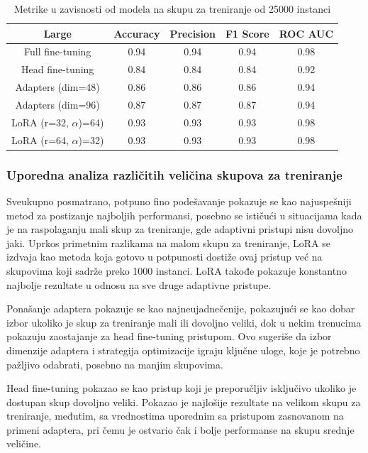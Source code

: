 \documentclass[12pt,oneside]{memoir}
\begin{document}
\begin{table}[h!]
	\centering
	\setlength{\tabcolsep}{12pt}
	\renewcommand{\arraystretch}{1.5}
	\begin{tabular}{|c|c|c|c|c|} 
		\hline
		\textbf{Large} & \textbf{Accuracy} & \textbf{Precision} & \textbf{F1 Score} & \textbf{ROC AUC}  \\
		\hline
		Full fine-tuning     & 0.94 & 0.94 & 0.94 & 0.98 \\ 
		Head fine-tuning     & 0.84 & 0.84 & 0.84 & 0.92 \\ 
		Adapters (dim=48)  & 0.86 & 0.86 & 0.86 & 0.94 \\ 
		Adapters (dim=96)  & 0.87 & 0.87 & 0.87 & 0.94 \\ 
		LoRA (r=32, \(\alpha\))=64)    & 0.93 & 0.93 & 0.93 & 0.98 \\ 
		LoRA (r=64, \(\alpha\))=32)    & 0.93 & 0.93 & 0.93 & 0.98 \\ 
		\hline
	\end{tabular}
	\caption{Metrike u zavisnosti od modela na skupu za treniranje od 25000 instanci}
	\label{tab:EvaluationFullDataset}
\end{table}

\subsubsection{Uporedna analiza različitih veličina skupova za treniranje}
Sveukupno posmatrano, potpuno fino podešavanje pokazuje se kao najuspešniji metod za postizanje najboljih performansi, posebno se ističući u situacijama kada je na raspolaganju mali skup za treniranje, gde adaptivni pristupi nisu dovoljno jaki. Uprkos primetnim razlikama na malom skupu za treniranje, LoRA se izdvaja kao metoda koja gotovo u potpunosti dostiže ovaj pristup već na skupovima koji sadrže preko 1000 instanci. LoRA takođe pokazuje konstantno najbolje rezultate u odnosu na sve druge adaptivne pristupe.

Ponašanje adaptera pokazuje se kao najneujadnečenije, pokazujući se kao dobar izbor ukoliko je skup za treniranje mali ili dovoljno veliki, dok u nekim trenucima pokazuju zaostajanje za head fine-tuning pristupom. Ovo sugeriše da izbor dimenzije adaptera i strategija optimizacije igraju ključne uloge, koje je potrebno pažljivo odabrati, posebno na manjim skupovima.

Head fine-tuning pokazao se kao pristup koji je preporučljiv isključivo ukoliko je dostupan skup dovoljno veliki. Pokazao je najlošije rezultate na velikom skupu za treniranje, međutim, sa vrednostima uporednim sa pristupom zasnovanom na primeni adaptera, pri čemu je ostvario čak i bolje performanse na skupu srednje veličine. 
\end{document}
